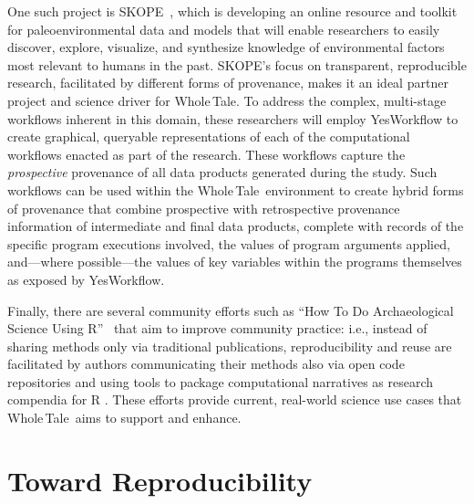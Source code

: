 \documentclass{elsarticle}
\newcommand{\wt}{Whole\,Tale}
\begin{document}
One such project is SKOPE~\cite{skope}, which is developing an online resource and toolkit for paleoenvironmental data and models that will enable researchers to easily discover, explore, visualize, and synthesize knowledge of environmental factors most relevant to humans in the past. SKOPE's focus on transparent, reproducible research, facilitated by different forms of provenance, makes it an ideal partner project and science driver for \wt.
To address the complex, multi-stage workflows inherent in this domain, these researchers will employ YesWorkflow \cite{mcphillips_yesworkflow:_2015,mcphillips2015retrospective} to create graphical, queryable representations of each of the computational workflows enacted as part of the research. These workflows capture the \emph{prospective} provenance of all data products generated during the study. Such workflows can be used within the \wt\ environment to create hybrid forms of provenance \cite{pimentel2016yin,zhang17revealing} that combine prospective with retrospective provenance information of intermediate and final data products, complete with records of the specific program executions involved, the values of program arguments applied, and---where possible---the values of key variables within the programs themselves as exposed by YesWorkflow.

Finally, there are several community efforts such as ``How To Do Archaeological Science Using R''~\cite{archR} that aim to improve community practice: i.e., instead of sharing methods only via traditional  publications, reproducibility and reuse are facilitated by authors communicating their methods also via open code repositories and using tools to package computational narratives as research compendia for R \cite{marwick2017packaging,bocinsky17provathon}. These efforts provide current, real-world science use cases that \wt\ aims to support and enhance.

\section{Toward Reproducibility}\label{sec:reproducibility}
\end{document}
